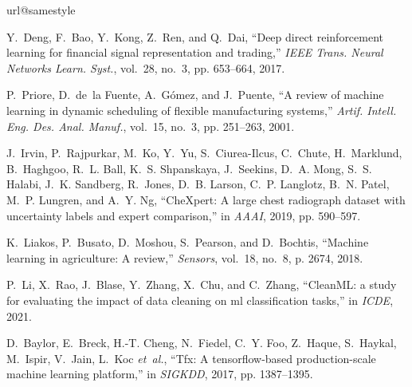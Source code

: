 \documentclass[11pt,dvipsnames]{article}
\begin{document}
\providecommand{\noopsort}[1]{}
\begin{thebibliography}{10}
\providecommand{\url}[1]{#1}
\csname url@samestyle\endcsname
\providecommand{\newblock}{\relax}
\providecommand{\bibinfo}[2]{#2}
\providecommand{\BIBentrySTDinterwordspacing}{\spaceskip=0pt\relax}
\providecommand{\BIBentryALTinterwordstretchfactor}{4}
\providecommand{\BIBentryALTinterwordspacing}{\spaceskip=\fontdimen2\font plus
\BIBentryALTinterwordstretchfactor\fontdimen3\font minus
  \fontdimen4\font\relax}
\providecommand{\BIBforeignlanguage}[2]{{%
\expandafter\ifx\csname l@#1\endcsname\relax
\typeout{** WARNING: IEEEtran.bst: No hyphenation pattern has been}%
\typeout{** loaded for the language `#1'. Using the pattern for}%
\typeout{** the default language instead.}%
\else
\language=\csname l@#1\endcsname
\fi
#2}}
\providecommand{\BIBdecl}{\relax}
\BIBdecl

Y.~Deng, F.~Bao, Y.~Kong, Z.~Ren, and Q.~Dai, ``Deep direct reinforcement
  learning for financial signal representation and trading,'' \emph{{IEEE}
  Trans. Neural Networks Learn. Syst.}, vol.~28, no.~3, pp. 653--664, 2017.

P.~Priore, D.~de~la Fuente, A.~G{\'{o}}mez, and J.~Puente, ``A review of
  machine learning in dynamic scheduling of flexible manufacturing systems,''
  \emph{Artif. Intell. Eng. Des. Anal. Manuf.}, vol.~15, no.~3, pp. 251--263,
  2001.

J.~Irvin, P.~Rajpurkar, M.~Ko, Y.~Yu, S.~Ciurea{-}Ilcus, C.~Chute, H.~Marklund,
  B.~Haghgoo, R.~L. Ball, K.~S. Shpanskaya, J.~Seekins, D.~A. Mong, S.~S.
  Halabi, J.~K. Sandberg, R.~Jones, D.~B. Larson, C.~P. Langlotz, B.~N. Patel,
  M.~P. Lungren, and A.~Y. Ng, ``Che{X}pert: {A} large chest radiograph dataset
  with uncertainty labels and expert comparison,'' in \emph{AAAI}, 2019, pp.
  590--597.

K.~Liakos, P.~Busato, D.~Moshou, S.~Pearson, and D.~Bochtis, ``Machine learning
  in agriculture: {A} review,'' \emph{Sensors}, vol.~18, no.~8, p. 2674, 2018.

P.~Li, X.~Rao, J.~Blase, Y.~Zhang, X.~Chu, and C.~Zhang, ``{CleanML:} a study
  for evaluating the impact of data cleaning on ml classification tasks,'' in
  \emph{ICDE}, 2021.

D.~Baylor, E.~Breck, H.-T. Cheng, N.~Fiedel, C.~Y. Foo, Z.~Haque, S.~Haykal,
  M.~Ispir, V.~Jain, L.~Koc \emph{et~al.}, ``Tfx: A tensorflow-based
  production-scale machine learning platform,'' in \emph{SIGKDD}, 2017, pp.
  1387--1395.


\end{thebibliography}
\end{document}
